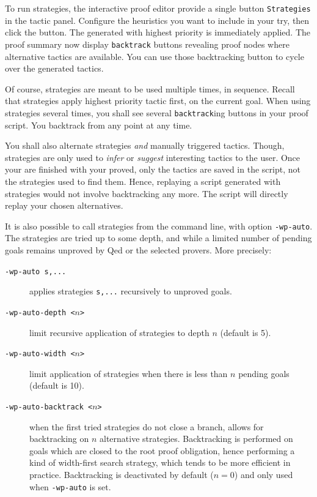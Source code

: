 To run strategies, the interactive proof editor provide a single button \texttt{Strategies} in the tactic panel.
Configure the heuristics you want to include in your try, then click the button. The generated with highest priority is immediately applied. The proof summary now display \texttt{backtrack} buttons revealing proof nodes where alternative tactics are available. You can use those backtracking button to cycle over the generated tactics.

Of course, strategies are meant to be used multiple times, in sequence. Recall that strategies apply highest priority tactic first, on the current goal. When using strategies several times, you shall see several \texttt{backtrack}ing buttons in your proof script. You backtrack from any point at any time.

You shall also alternate strategies \emph{and} manually triggered tactics. Though, strategies are only used to
\emph{infer} or \emph{suggest} interesting tactics to the user. Once your are finished with your proved, only the tactics are saved in the script, not the strategies used to find them. Hence, replaying a script generated with strategies would not involve backtracking any more. The script will directly replay your chosen alternatives.

It is also possible to call strategies from the command line, with option \texttt{-wp-auto}. The strategies are tried up to some depth, and while a limited number of pending goals
remains unproved by \textsf{Qed} or the selected provers. More precisely:
\begin{description}
\item[\tt -wp-auto s,...] applies strategies \texttt{s,...} recursively to unproved goals.
\item[\tt -wp-auto-depth <$n$>] limit recursive application of strategies to depth $n$ (default is 5).
\item[\tt -wp-auto-width <$n$>] limit application of strategies when there is less than $n$ pending goals (default is 10).
\item[\tt -wp-auto-backtrack <$n$>] when the first tried strategies do not close a branch, allows for backtracking
  on $n$ alternative strategies. Backtracking is performed on goals which are closed to the root proof obligation, hence
  performing a kind of width-first search strategy, which tends to be more efficient in practice.
  Backtracking is deactivated by default ($n=0$) and only used when \verb+-wp-auto+ is set.
\end{description}

